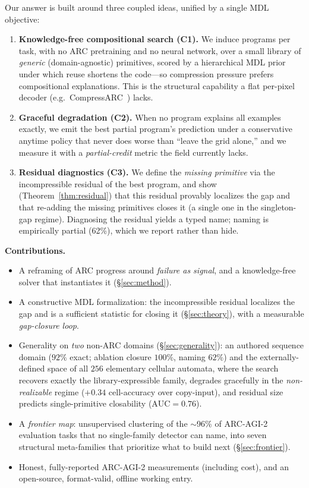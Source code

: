 \documentclass[11pt]{article}
\begin{document}
Our answer is built around three coupled ideas, unified by a single MDL objective:
\begin{enumerate}[leftmargin=1.4em,itemsep=2pt]
  \item \textbf{Knowledge-free compositional search (C1).} We induce programs per task, with no ARC
  pretraining and no neural network, over a small library of \emph{generic} (domain-agnostic) primitives,
  scored by a hierarchical MDL prior under which reuse shortens the code---so compression pressure prefers
  compositional explanations. This is the structural capability a flat per-pixel decoder
  (e.g.\ CompressARC~\cite{liao2025compressarc}) lacks.
  \item \textbf{Graceful degradation (C2).} When no program explains all examples exactly, we emit the best
  partial program's prediction under a conservative anytime policy that never does worse than ``leave the grid
  alone,'' and we measure it with a \emph{partial-credit} metric the field currently lacks.
  \item \textbf{Residual diagnostics (C3).} We define the \emph{missing primitive} via the incompressible
  residual of the best program, and show (Theorem~\ref{thm:residual}) that this residual provably localizes
  the gap and that re-adding the missing primitives closes it (a single one in the singleton-gap regime).
  Diagnosing the residual yields a typed name;
  naming is empirically partial (62\%), which we report rather than hide.
\end{enumerate}

\noindent\textbf{Contributions.}
\begin{itemize}[leftmargin=1.4em,itemsep=1pt]
  \item A reframing of ARC progress around \emph{failure as signal}, and a knowledge-free solver that
  instantiates it (\S\ref{sec:method}).
  \item A constructive MDL formalization: the incompressible residual localizes the gap and is a sufficient
  statistic for closing it (\S\ref{sec:theory}), with a measurable \emph{gap-closure loop}.
  \item Generality on \emph{two} non-ARC domains (\S\ref{sec:generality}): an authored sequence domain ($92\%$
  exact; ablation closure $100\%$, naming $62\%$) and the externally-defined space of all $256$ elementary
  cellular automata, where the search recovers exactly the library-expressible family, degrades gracefully in
  the \emph{non-realizable} regime ($+0.34$ cell-accuracy over copy-input), and residual size predicts
  single-primitive closability ($\mathrm{AUC}=0.76$).
  \item A \emph{frontier map}: unsupervised clustering of the $\sim$96\% of ARC-AGI-2 evaluation tasks that no
  single-family detector can name, into seven structural meta-families that prioritize what to build next
  (\S\ref{sec:frontier}).
  \item Honest, fully-reported ARC-AGI-2 measurements (including cost), and an open-source, format-valid,
  offline working entry.
\end{itemize}
\end{document}
